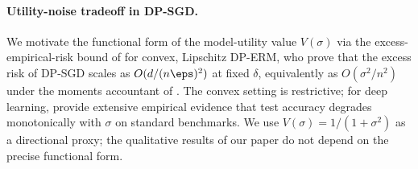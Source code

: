 \paragraph{Utility-noise tradeoff in DP-SGD.}
We motivate the functional form of the model-utility value $V(\sigma)$ via
the excess-empirical-risk bound of \citet{bassily2014private} for convex,
Lipschitz DP-ERM, who prove that the excess risk of DP-SGD scales as
$O(d / (n\eps)^2)$ at fixed $\delta$, equivalently as $O(\sigma^2 / n^2)$
under the moments accountant of \citet{abadi2016deep}. The convex setting
is restrictive; for deep learning, \citet{tramer2021private} provide
extensive empirical evidence that test accuracy degrades monotonically with
$\sigma$ on standard benchmarks. We use $V(\sigma) = 1/(1+\sigma^2)$ as a
directional proxy; the qualitative results of our paper do not depend on
the precise functional form.
